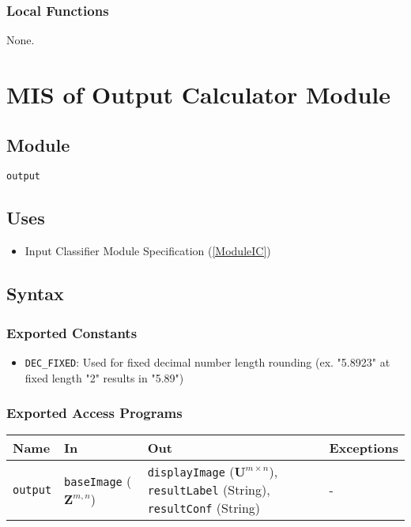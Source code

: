 \documentclass[12pt, titlepage]{article}
\def\code#1{\texttt{#1}}
\begin{document}
\subsubsection{Local Functions}

None.

\section{MIS of Output Calculator Module} \label{ModuleO} 


\subsection{Module}

\code{output}

\subsection{Uses}

\begin{itemize}
  \item Input Classifier Module Specification (\ref{ModuleIC})
\end{itemize}

\subsection{Syntax}

\subsubsection{Exported Constants}

\begin{itemize}
  \item \code{DEC\_FIXED}: Used for fixed decimal number length rounding (ex. "5.8923" at fixed length "2" results in "5.89")
\end{itemize}

\subsubsection{Exported Access Programs}

\begin{center}
\begin{tabular}{p{2cm} p{2cm} p{6cm} p{2cm}}
\hline
\textbf{Name} & \textbf{In} & \textbf{Out} & \textbf{Exceptions} \\
\hline
\code{output} & \code{baseImage} ($\mathbf{Z}^{m,n}$) & \code{displayImage} ($\mathbf{U}^{m \times n}$), \code{resultLabel} (String), \code{resultConf} (String) & - \\
\hline
\end{tabular}
\end{center}
\end{document}
